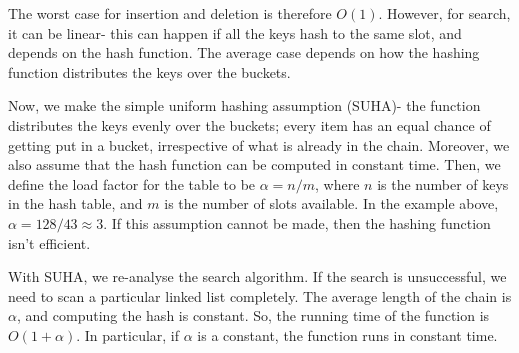 \documentclass[a4paper, openany]{memoir}
\begin{document}
\noindent The worst case for insertion and deletion is therefore $O(1)$. However, for search, it can be linear- this can happen if all the keys hash to the same slot, and depends on the hash function. The average case depends on how the hashing function distributes the keys over the buckets.

\noindent Now, we make the simple uniform hashing assumption (SUHA)- the function distributes the keys evenly over the buckets; every item has an equal chance of getting put in a bucket, irrespective of what is already in the chain. Moreover, we also assume that the hash function can be computed in constant time. Then, we define the load factor for the table to be $\alpha = n/m$, where $n$ is the number of keys in the hash table, and $m$ is the number of slots available. In the example above, $\alpha = 128/43 \approx 3$. If this assumption cannot be made, then the hashing function isn't efficient.

\noindent With SUHA, we re-analyse the search algorithm. If the search is unsuccessful, we need to scan a particular linked list completely. The average length of the chain is $\alpha$, and computing the hash is constant. So, the running time of the function is $O(1 + \alpha)$. In particular, if $\alpha$ is a constant, the function runs in constant time.
\end{document}
